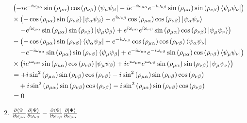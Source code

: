 \documentclass{aux/ttuthes2007}
\newcommand{\bra}[1]{\ensuremath{\left\langle#1\right\vert}}
\newcommand{\ket}[1]{\ensuremath{\left|#1\right\rangle}}
\newcommand{\s}[1]{\sin\left( #1 \right)}
\newcommand{\ssq}[1]{\sin^2\left( #1 \right)}
\newcommand{\co}[1]{\cos\left( #1 \right)}
\newcommand{\kpp}[1]{\frac{\partial \ket\Psi}{\partial #1}}
\newcommand{\bpp}[1]{\frac{\partial \bra\Psi}{\partial #1}}
\newcommand{\ind}[1]{{\uo #1 \oo #1}}
\newcommand{\uo}[1]{
		\IfEqCase{#1}{
			{0}{\mu}
			{1}{\nu}
			{2}{\xi}
		}[\PackageError{uo}{Undefined option to uo: #1}{}]
}
\newcommand{\oo}[1]{
		\IfEqCase{#1}{
			{0}{\alpha}
			{1}{\beta}
			{2}{\gamma}
		}[\PackageError{unocorb}{Undefined option to unuo: #1}{}]
}
\begin{document}
\begin{enumerate}
\begin{align*}
	&\left (
	-i e^{ -i \omega_\ind 0}\s {\rho_\ind 0}\co {\rho_\ind 1}\bra{\psi_{\uo 0} \psi_{\oo 1}} 
	-i e^{ -i \omega_\ind 0}e^{ -i \omega_\ind 1}\s {\rho_\ind 0}\s {\rho_\ind 1}\bra{\psi_{\uo 0} \psi_{\uo 1}} 
	\right )
	\\
	&\times\left (
	-\co {\rho_\ind 0}\s {\rho_\ind 1}\ket {\psi_{\oo 0}\psi_{\oo 1}}
	+ e^{i\omega_\ind 1}\co {\rho_\ind 0 }\co {\rho_\ind 1}\ket {\psi_{\oo 0}\psi_{\uo 1}} 
	\right .
	\\
	&\left .
	\quad - e^{i\omega_\ind 0}\s {\rho_\ind 0}\s {\rho_\ind 1}\ket{\psi_{\uo 0} \psi_{\oo 1}} 
	+ e^{i\omega_\ind 0}e^{i\omega_\ind 1}\s {\rho_\ind 0}\co {\rho_\ind 1}\ket{\psi_{\uo 0} \psi_{\uo 1}} 
	\right )
	\\
	&-\left (
	-\co {\rho_\ind 0}\s {\rho_\ind 1}\bra {\psi_{\oo 0}\psi_{\oo 1}}
	+ e^{ -i \omega_\ind 1}\co {\rho_\ind 0 }\co {\rho_\ind 1}\bra {\psi_{\oo 0}\psi_{\uo 1}} 
	\right .
	\\
	&\left .
	\quad - e^{ -i \omega_\ind 0}\s {\rho_\ind 0}\s {\rho_\ind 1}\bra{\psi_{\uo 0} \psi_{\oo 1}} 
	+ e^{ -i \omega_\ind 0}e^{ -i \omega_\ind 1}\s {\rho_\ind 0}\co {\rho_\ind 1}\bra{\psi_{\uo 0} \psi_{\uo 1}} 
	\right )
	\\
	&\times\left (
	ie^{i\omega_\ind 0}\s {\rho_\ind 0}\co {\rho_\ind 1}\ket{\psi_{\uo 0} \psi_{\oo 1}} 
	+ ie^{i\omega_\ind 0}e^{i\omega_\ind 1}\s {\rho_\ind 0}\s {\rho_\ind 1}\ket{\psi_{\uo 0} \psi_{\uo 1}} 
	\right )
	\\
	&= +i \ssq {\rho_\ind 0}\s {\rho_\ind 1}\co {\rho_\ind 1}
	   -i \ssq {\rho_\ind 0}\s {\rho_\ind 1}\co {\rho_\ind 1}
	\\
	&\quad+i \ssq {\rho_\ind 0}\s {\rho_\ind 1}\co {\rho_\ind 1}
	 -i \ssq {\rho_\ind 0}\s {\rho_\ind 1}\co {\rho_\ind 1}
	\\
	&= 0
\end{align*}

	\item $ \bpp{\omega_\ind 0} \kpp{\omega_\ind 1}
	- \bpp{\omega_\ind 1} \kpp{\omega_\ind 0}$


\end{enumerate}
\end{document}
